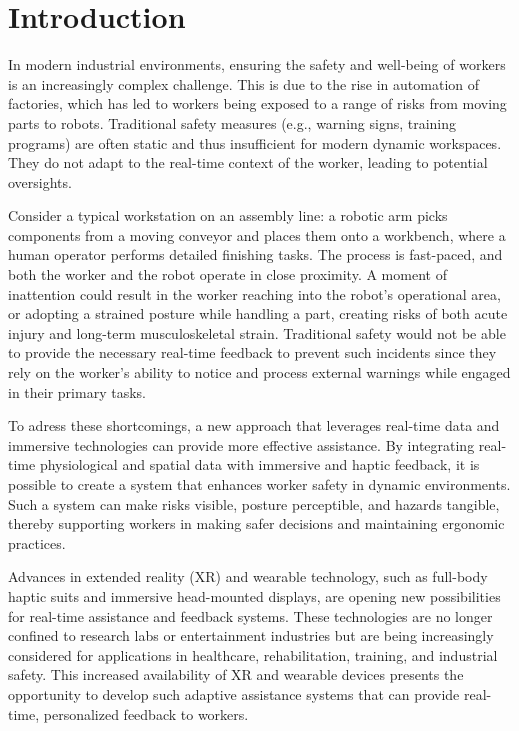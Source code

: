 \chapter{Introduction}
In modern industrial environments, ensuring the safety and well-being of workers is an increasingly complex challenge. This is due to the rise in automation of factories, which has led to workers being exposed to a range of risks from moving parts to robots. Traditional safety measures (e.g., warning signs, training programs) are often static and thus insufficient for modern dynamic workspaces. They do not adapt to the real-time context of the worker, leading to potential oversights.

Consider a typical workstation on an assembly line: a robotic arm picks components from a moving conveyor and places them onto a workbench, where a human operator performs detailed finishing tasks. The process is fast-paced, and both the worker and the robot operate in close proximity. A moment of inattention could result in the worker reaching into the robot’s operational area, or adopting a strained posture while handling a part, creating risks of both acute injury and long-term musculoskeletal strain. Traditional safety would not be able to provide the necessary real-time feedback to prevent such incidents since they rely on the worker's ability to notice and process external warnings while engaged in their primary tasks.

To adress these shortcomings, a new approach that leverages real-time data and immersive technologies can provide more effective assistance. By integrating real-time physiological and spatial data with immersive and haptic feedback, it is possible to create a system that enhances worker safety in dynamic environments. Such a system can make risks visible, posture perceptible, and hazards tangible, thereby supporting workers in making safer decisions and maintaining ergonomic practices.

Advances in extended reality (XR) and wearable technology, such as full-body haptic suits and immersive head-mounted displays, are opening new possibilities for real-time assistance and feedback systems. These technologies are no longer confined to research labs or entertainment industries but are being increasingly considered for applications in healthcare, rehabilitation, training, and industrial safety. This increased availability of XR and wearable devices presents the opportunity to develop such adaptive assistance systems that can provide real-time, personalized feedback to workers.

